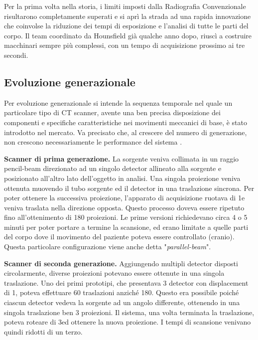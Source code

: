 \documentclass[a4paper,12pt, doubleside]{report}
\begin{document}
                \bigskip
                \par
                    Per la prima volta nella storia, i limiti imposti dalla Radiografia Convenzionale risultarono completamente superati e si aprì la strada ad una rapida innovazione che coinvolse la riduzione dei tempi di esposizione e l'analisi di tutte le parti del corpo. Il team coordinato da Hounsfield già qualche anno dopo, riuscì a costruire macchinari sempre più complessi, con un tempo di acquisizione prossimo ai tre secondi.
                            
            \subsection{Evoluzione generazionale}
                \par
                    Per evoluzione generazionale si intende la sequenza temporale nel quale un particolare tipo di CT scanner, avente una ben precisa disposizione dei componenti e specifiche caratteristiche nei movimenti meccanici di base, è stato introdotto nel mercato. Va precisato che, al crescere del numero di generazione, non crescono necessariamente le performance del sistema \cite{generazionale}.
                        
                \bigskip
                \par
                    \textbf{Scanner di prima generazione.} La sorgente veniva collimata in un raggio pencil-beam direzionato ad un singolo detector allineato alla sorgente e posizionato all’altro lato dell'oggetto in analisi. Una singola proiezione veniva ottenuta muovendo il tubo sorgente ed il detector in una traslazione sincrona. Per poter ottenere la successiva proiezione, l'apparato di acquisizione ruotava di 1\degree e veniva traslata nella direzione opposta. Questo processo doveva essere ripetuto fino all’ottenimento di 180 proiezioni. Le prime versioni richiedevano circa 4 o 5 minuti per poter portare a termine la scansione, ed erano limitate a quelle parti del corpo dove il movimento del paziente poteva essere controllato (cranio). Questa particolare configurazione viene anche detta "\textit{parallel-beam}".
                            
                \bigskip
                \par
                    \textbf{Scanner di seconda generazione.} Aggiungendo multipli detector disposti circolarmente, diverse proiezioni potevano essere ottenute in una singola traslazione. Uno dei primi prototipi, che presentava 3 detector con displacement di 1\degree, poteva effettuare 60 traslazioni anziché 180. Questo era possibile poiché ciascun detector vedeva la sorgente ad un angolo differente, ottenendo in una singola traslazione ben 3 proiezioni. Il sistema, una volta terminata la traslazione, poteva roteare di 3\degree  ed ottenere la nuova proiezione. I tempi di scansione venivano quindi ridotti di un terzo. 
                        
\end{document}
